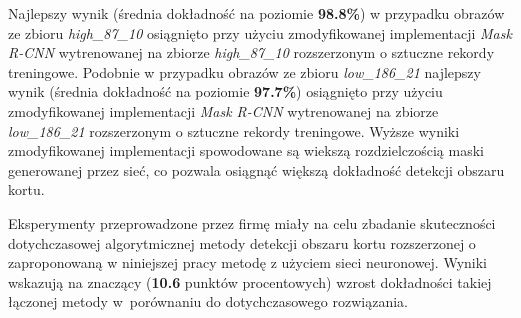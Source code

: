 Najlepszy wynik (średnia dokładność na poziomie \textbf{98.8\%}) w przypadku obrazów ze zbioru \textit{high\_87\_10} osiągnięto przy użyciu zmodyfikowanej implementacji \textit{Mask R-CNN} wytrenowanej na zbiorze \textit{high\_87\_10} rozszerzonym o sztuczne rekordy treningowe. Podobnie w przypadku obrazów ze zbioru \textit{low\_186\_21} najlepszy wynik (średnia dokładność na poziomie \textbf{97.7\%}) osiągnięto przy użyciu zmodyfikowanej implementacji \textit{Mask R-CNN} wytrenowanej na zbiorze \textit{low\_186\_21} rozszerzonym o sztuczne rekordy treningowe. Wyższe wyniki zmodyfikowanej implementacji spowodowane są wiekszą rozdzielczością maski generowanej przez sieć, co pozwala osiągnąć większą dokładność detekcji obszaru kortu.

Eksperymenty przeprowadzone przez firmę \blue{} miały na celu zbadanie skuteczności dotychczasowej algorytmicznej metody detekcji obszaru kortu rozszerzonej o zaproponowaną w niniejszej pracy metodę z użyciem sieci neuronowej. Wyniki wskazują na znaczący (\textbf{10.6} punktów procentowych) wzrost dokładności takiej łączonej metody w~porównaniu do dotychczasowego rozwiązania.

